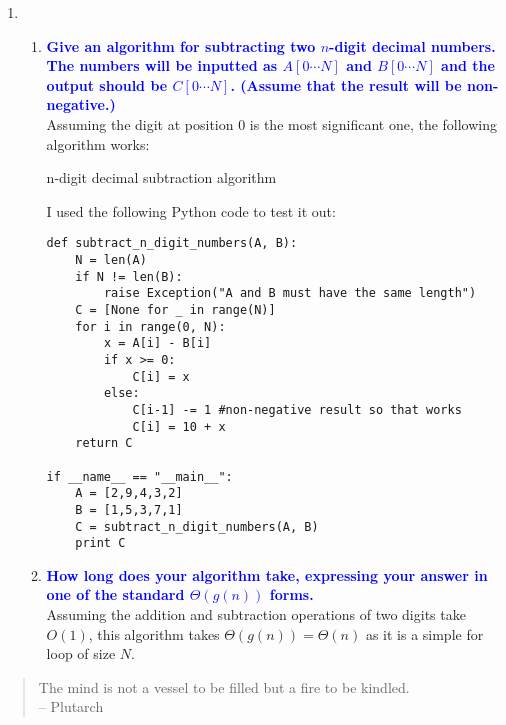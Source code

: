 \documentclass[11pt]{article}
\begin{document}
\begin{enumerate}
\item 
    \begin{enumerate}
    \item \textbf{\textcolor{blue}{Give an algorithm for subtracting two $n$-digit decimal numbers. The numbers will be inputted as $A[0\cdots N]$ and $B[0\cdots N]$ and the output should be $C[0\cdots N]$. (Assume that the result will be non-negative.)}}
    \\ Assuming the digit at position $0$ is the most significant one, the following algorithm works:
    \begin{algorithm}[H]
        \caption{n-digit decimal subtraction algorithm}
    \end{algorithm}
    I used the following Python code to test it out:
    \begin{verbatim}
def subtract_n_digit_numbers(A, B):
    N = len(A)
    if N != len(B):
        raise Exception("A and B must have the same length")
    C = [None for _ in range(N)]
    for i in range(0, N):
        x = A[i] - B[i]
        if x >= 0:
            C[i] = x
        else:
            C[i-1] -= 1 #non-negative result so that works
            C[i] = 10 + x
    return C    

if __name__ == "__main__":
    A = [2,9,4,3,2]
    B = [1,5,3,7,1]
    C = subtract_n_digit_numbers(A, B)
    print C
    \end{verbatim}

    \item \textbf{\textcolor{blue}{How long does your algorithm take, expressing your answer in one of the standard $\Theta(g(n))$ forms.}}
        \\ Assuming the addition and subtraction operations of two digits take $O(1)$, this algorithm takes $\Theta(g(n))=\Theta(n)$ as it is a simple for loop of size $N$.
    \end{enumerate}
\end{enumerate}

\begin{quote}
The mind is not a vessel to be filled but a fire to be kindled.  \\ -- Plutarch
\end{quote}
\end{document}
